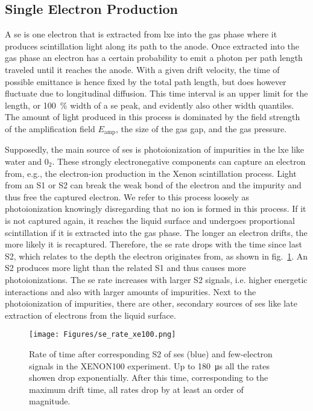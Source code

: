 
\FloatBarrier
\subsection{Single Electron Production}
\label{ssec:se-source}
\FloatBarrier


A \gls{se} is one electron that is extracted from \gls{lxe} into the gas phase where it produces scintillation light along its path to the anode.
Once extracted into the gas phase an electron has a certain probability to emit a photon per path length traveled until it reaches the anode. %
With a given drift velocity, the time of possible emittance is hence fixed by the total path length, but does however fluctuate due to longitudinal diffusion.
This time interval is an upper limit for the length, or \SI{100}{\%} width of a \gls{se} peak, and evidently also other width quantiles.
The amount of light produced in this process is dominated by the field strength of the amplification field $ E_\mathrm{amp} $, the size of the gas gap, and the gas pressure.

Supposedly, the main source of \glspl{se} is photoionization of impurities in the \gls{lxe} like water and $ 0_2 $.
These strongly electronegative components can capture an electron from, e.g., the electron-ion production in the Xenon scintillation process.
Light from an S1 or S2 can break the weak bond of the electron and the impurity and thus free the captured electron.
We refer to this process loosely as photoionization knowingly disregarding that no ion is formed in this process.
If it is not captured again, it reaches the liquid surface and undergoes proportional scintillation if it is extracted into the gas phase.
The longer an electron drifts, the more likely it is recaptured.
Therefore, the \gls{se} rate drops with the time since last S2, which relates to the depth the electron originates from, as shown in fig.~\ref{fig:se-rate-xe100}.  %
An S2 produces more light than the related S1 and thus causes more photoionizations.
The \gls{se} rate increases with larger S2 signals, i.e. higher energetic interactions and also with larger amounts of impurities\cite{?}.  %
Next to the photoionization of impurities, there are other, secondary sources of \glspl{se} like late extraction of electrons from the liquid surface.


\begin{figure}
    \centering
    \texttt{[image: Figures/se\_rate\_xe100.png]}  %
    \caption[Single Electron Rate in 1T/100/LUX]{
        Rate of time after corresponding S2 of \glspl{se} (blue) and few-electron signals in the XENON100 experiment.
        Up to \SI{180}{\micro\second} all the rates showen drop exponentially.
        After this time, corresponding to the maximum drift time, all rates drop by at least an order of magnitude.~\cite{Aprile2014}
    }
    \label{fig:se-rate-xe100}
\end{figure}


